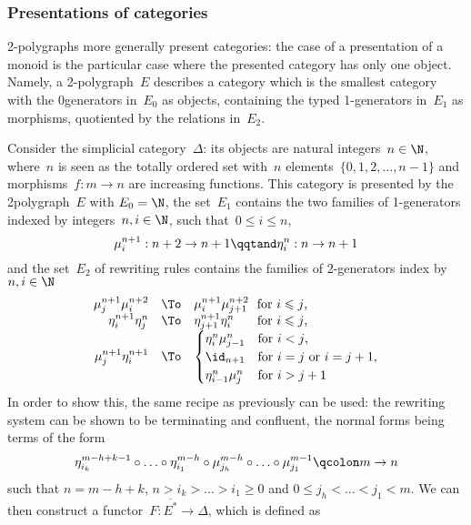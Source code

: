 \documentclass{LMCS}
\renewcommand{\leq}{\leqslant}
\begin{document}
\subsubsection{Presentations of categories}
2-polygraphs more generally present categories: the case of a presentation of a
monoid is the particular case where the presented category has only one
object. Namely, a 2-polygraph~$E$ describes a category which is the smallest
category with the 0\nbd{}generators in~$E_0$ as objects, containing the typed
1-generators in~$E_1$ as morphisms, quotiented by the relations in~$E_2$.

\begin{exa}
  \label{ex:pres-delta-cat}
  Consider the simplicial category~$\Delta$: its objects are natural
  integers~$n\in\N$, where~$n$ is seen as the totally ordered set with~$n$
  elements~$\{0,1,2,\ldots,n-1\}$ and morphisms~$f:m\to n$ are increasing
  functions. This category is presented by the 2\nbd{}polygraph~$E$ with
  $E_0=\N$, the set~$E_1$ contains the two families of 1-generators indexed by
  integers~\hbox{$n,i\in\N$}, such that~$0\leq i\leq n$,
  \[
  \mu_i^{n+1}:n+2\to n+1
  \qqtand
  \eta_i^n:n\to n+1
  \]
  and the set~$E_2$ of rewriting rules contains the families of 2-generators
  index by $n,i\in\N$
  \[
  \begin{array}{rcl}
    \mu^{n+1}_j\mu^{n+2}_i&\To&\mu^{n+1}_i\mu^{n+2}_{j+1}\hspace{1.5ex}\text{for $i\leq j$,}\\
    \eta^{n+1}_i\eta^n_j&\To&\eta^{n+1}_{j+1}\eta^n_i\hspace{4.2ex}\text{for $i\leq j$,}\\
    \mu_j^{n+1}\eta_i^{n+1}&\To&
    \begin{cases}
      \eta_i^n\mu_{j-1}^n&\text{for $i<j$,}\\
      \id_{n+1}&\text{for $i=j$ or $i=j+1$,}\\
      \eta^n_{i-1}\mu^n_j&\text{for $i>j+1$}\\
    \end{cases}
  \end{array}
  \]
  In order to show this, the same recipe as previously can be used: the
  rewriting system can be shown to be terminating and confluent, the normal
  forms being terms of the form
  \[
  \eta_{i_k}^{m-h+k-1}\circ\ldots\circ\eta_{i_1}^{m-h}\circ\mu_{j_h}^{m-h}\circ\ldots\circ\mu_{j_1}^{m-1}
  \qcolon
  m\to n
  \]
  such that $n=m-h+k$, $n>i_k>\ldots>i_1\geq 0$ and $0\leq j_h<\ldots<j_1<m$. We
  can then construct a functor~$F:\overline{E^*}\to\Delta$, which is defined as

\end{exa}
\end{document}
